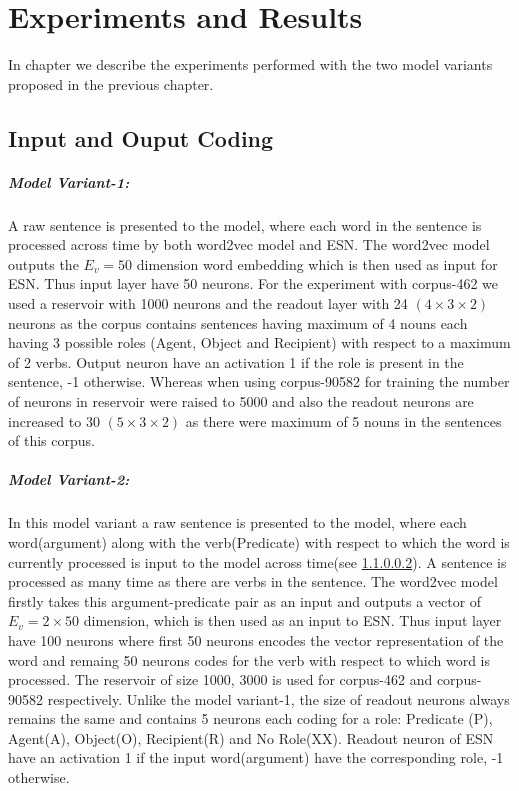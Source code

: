 \chapter{Experiments and Results}\label{results}

In chapter we describe the experiments performed with the two model variants proposed in the previous chapter. 

\section{Input and Ouput Coding}

\paragraph{Model Variant-1:} A raw sentence is presented to the model, where each word in the sentence is processed across time by both word2vec model and ESN. The word2vec model outputs the $E_{v}=50$ dimension word embedding which is then used as input for ESN. Thus input layer have 50 neurons. For the experiment with corpus-462 we used a reservoir with 1000 neurons and the readout layer with 24 $(4 \times 3 \times 2)$ neurons as the corpus contains sentences having maximum of 4 nouns each having 3 possible roles (Agent, Object and Recipient) with respect to a maximum of 2 verbs. Output neuron have an activation 1 if the role is present in the sentence, -1 otherwise. Whereas when using corpus-90582 for training the number of neurons in reservoir were raised to 5000 and also the  readout neurons are increased to 30 $(5 \times 3 \times 2)$ as there were maximum of 5 nouns in the sentences of this corpus.

\paragraph{Model Variant-2:} In this model variant a raw sentence is presented to the model, where each word(argument) along with the verb(Predicate) with respect to which the word is currently processed is input to the model across time(see \ref{}). A sentence is processed as many time as there are verbs in the sentence. The word2vec model firstly takes this argument-predicate pair as an input and outputs a vector of $E_{v}=2 \times 50$ dimension, which is then used as an input to ESN. Thus input layer have 100 neurons where first 50 neurons encodes the vector representation of the word and remaing 50 neurons codes for the verb with respect to which word is processed. The reservoir of size 1000, 3000 is used for corpus-462 and corpus-90582 respectively. Unlike the model variant-1, the size of readout neurons always remains the same and contains 5 neurons each coding for a role: Predicate (P), Agent(A), Object(O), Recipient(R) and No Role(XX). Readout neuron of ESN have an activation 1 if the input word(argument) have the corresponding role, -1 otherwise.

